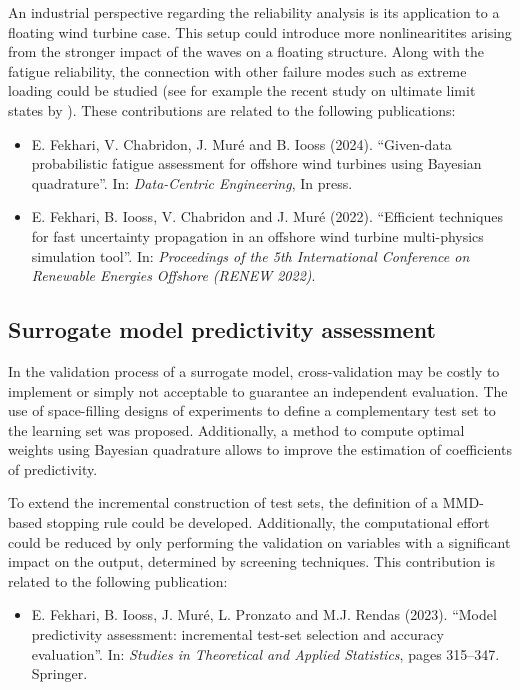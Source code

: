 An industrial perspective regarding the reliability analysis is its application to a floating wind turbine case. 
This setup could introduce more nonlinearitites arising from the stronger impact of the waves on a floating structure. 
Along with the fatigue reliability, the connection with other failure modes such as extreme loading could be studied (see for example the recent study on ultimate limit states by \citealp{wang_schar_2023_uls}). 
These contributions are related to the following publications:
\begin{itemize}
    \footnotesize
    \item[\ding{125}] E. Fekhari, V. Chabridon, J. Muré and B. Iooss (2024). ``Given-data probabilistic fatigue assessment for offshore wind turbines using Bayesian quadrature''. In: \textit{Data-Centric Engineering}, In press.
    \item[\ding{125}] E. Fekhari, B. Iooss, V. Chabridon and J. Muré (2022). ``Efficient techniques for fast uncertainty propagation in an offshore wind turbine multi-physics simulation tool''. In: \textit{Proceedings of the 5th International Conference on Renewable Energies Offshore (RENEW 2022)}.
\end{itemize}

\subsection*{Surrogate model predictivity assessment}

In the validation process of a surrogate model, cross-validation may be costly to implement or simply not acceptable to guarantee an independent evaluation.  
The use of space-filling designs of experiments to define a complementary test set to the learning set was proposed. 
Additionally, a method to compute optimal weights using Bayesian quadrature allows to improve the estimation of coefficients of predictivity. 

To extend the incremental construction of test sets, the definition of a MMD-based stopping rule could be developed. 
Additionally, the computational effort could be reduced by only performing the validation on variables with a significant impact on the output, determined by screening techniques. 
This contribution is related to the following publication:
\begin{itemize}
    \footnotesize
    \item[\ding{125}] E. Fekhari, B. Iooss, J. Muré, L. Pronzato and M.J. Rendas (2023). ``Model predictivity assessment: incremental test-set selection and accuracy evaluation''. In: \textit{Studies in Theoretical and Applied Statistics}, pages 315--347. Springer.
\end{itemize}

